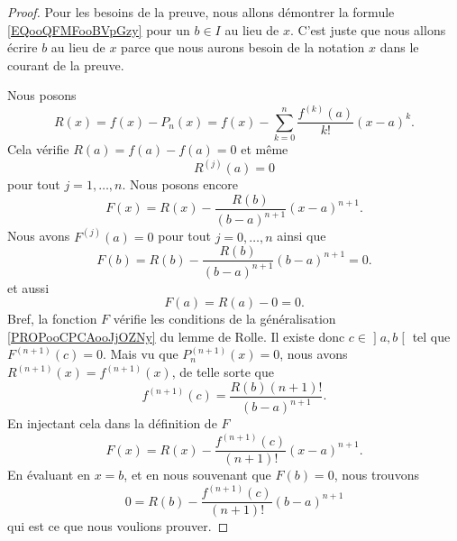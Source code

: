 \begin{proof}
    Pour les besoins de la preuve, nous allons démontrer la formule \eqref{EQooQFMFooBVpGzy} pour un \( b\in I\) au lieu de \( x\). C'est juste que nous allons écrire \( b\) au lieu de \( x\) parce que nous aurons besoin de la notation \( x\) dans le courant de la preuve.

    Nous posons
    \begin{equation}
        R(x)=f(x)-P_n(x)=f(x)-\sum_{k=0}^n\frac{ f^{(k)}(a) }{ k! }(x-a)^k.
    \end{equation}
    Cela vérifie \( R(a)=f(a)-f(a)=0\) et même
    \begin{equation}
        R^{(j)}(a)=0
    \end{equation}
    pour tout \( j=1,\ldots, n\). Nous posons encore
    \begin{equation}
        F(x)=R(x)-\frac{ R(b) }{ (b-a)^{n+1} }(x-a)^{n+1}.
    \end{equation}
    Nous avons \( F^{(j)}(a)=0\) pour tout \( j=0,\ldots, n\) ainsi que
    \begin{equation}
        F(b)=R(b)-\frac{ R(b) }{ (b-a)^{n+1} }(b-a)^{n+1}=0.
    \end{equation}
    et aussi
    \begin{equation}
        F(a)=R(a)-0=0.
    \end{equation}
Bref, la fonction \( F\) vérifie les conditions de la généralisation \ref{PROPooCPCAooJjOZNy} du lemme de Rolle. Il existe donc \( c\in\mathopen] a , b \mathclose[\) tel que \( F^{(n+1)}(c)=0\). Mais vu que \( P_n^{(n+1)}(x)=0\), nous avons \( R^{(n+1)}(x)=f^{(n+1)}(x)\), de telle sorte que
    \begin{equation}
        f^{(n+1)}(c)=\frac{ R(b)(n+1)! }{ (b-a)^{n+1} }.
    \end{equation}
    En injectant cela dans la définition de \( F\)
    \begin{equation}
        F(x)=R(x)-\frac{ f^{(n+1)}(c) }{ (n+1)! }(x-a)^{n+1}.
    \end{equation}
    En évaluant en \( x=b\), et en nous souvenant que \( F(b)=0\), nous trouvons
    \begin{equation}
        0=R(b)-\frac{ f^{(n+1)}(c) }{ (n+1)! }(b-a)^{n+1}
    \end{equation}
    qui est ce que nous voulions prouver.
\end{proof}

